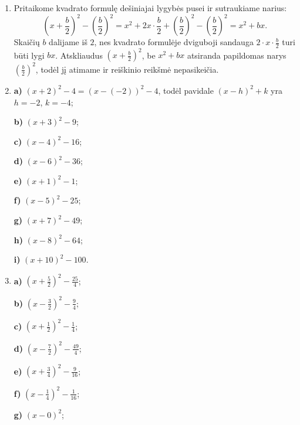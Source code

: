 \documentclass[12pt,a4paper]{article}
\begin{document}
\begin{enumerate}
\textbf{b)} Trūkstamas kvadratas turi kraštinę $\frac{b}{2}$, taigi jo plotas $\left(\frac{b}{2}\right)^2$. Didžiojo kvadrato kraštinė yra $x+\frac{b}{2}$, o plotas – $\left(x+\frac{b}{2}\right)^2$.

\textbf{c)} Didžiojo kvadrato plotą sudaro sritys $A$, $B$, $C$ ir kvadratas $D$. Todėl $A$, $B$ ir $C$ sričių plotą randame iš didžiojo kvadrato ploto atimdami kvadrato $D$ plotą:
\[
x^2+bx=\left(x+\frac{b}{2}\right)^2-\left(\frac{b}{2}\right)^2.
\]

\textbf{d)} Kai $b<0$, skaičius $\frac{b}{2}$ yra neigiamas, todėl negali būti atkarpos ilgis ir brėžinys netinka. Lygybę galima pagrįsti algebriškai, nelaikant $b$ ir $x$ atkarpų ilgiais. Tai padarysime 4 uždavinyje.
\item Pritaikome kvadrato formulę dešiniajai lygybės pusei ir sutraukiame narius:
\[
\left(x+\frac{b}{2}\right)^2-\left(\frac{b}{2}\right)^2
=x^2+2x\cdot\frac{b}{2}+\left(\frac{b}{2}\right)^2-\left(\frac{b}{2}\right)^2=x^2+bx.
\]
Skaičių $b$ dalijame iš $2$, nes kvadrato formulėje dviguboji sandauga $2\cdot x\cdot\frac{b}{2}$ turi būti lygi $bx$. Atskliaudus $\left(x+\frac{b}{2}\right)^2$, be $x^2+bx$ atsiranda papildomas narys $\left(\frac{b}{2}\right)^2$, todėl jį atimame ir reiškinio reikšmė nepasikeičia.
\item \textbf{a)} $(x+2)^2-4=(x-(-2))^2-4$, todėl pavidale $(x-h)^2+k$ yra $h=-2$, $k=-4$;

\textbf{b)} $(x+3)^2-9$;

\textbf{c)} $(x-4)^2-16$;

\textbf{d)} $(x-6)^2-36$;

\textbf{e)} $(x+1)^2-1$;

\textbf{f)} $(x-5)^2-25$;

\textbf{g)} $(x+7)^2-49$;

\textbf{h)} $(x-8)^2-64$;

\textbf{i)} $(x+10)^2-100$.
\item \textbf{a)} $(x+\frac{5}{2})^2-\frac{25}{4}$;

\textbf{b)} $(x-\frac{3}{2})^2-\frac{9}{4}$;

\textbf{c)} $(x+\frac{1}{2})^2-\frac{1}{4}$;

\textbf{d)} $(x-\frac{7}{2})^2-\frac{49}{4}$;

\textbf{e)} $(x+\frac{3}{4})^2-\frac{9}{16}$;

\textbf{f)} $(x-\frac{1}{4})^2-\frac{1}{16}$;

\textbf{g)} $(x-0)^2$;


\end{enumerate}
\end{document}
